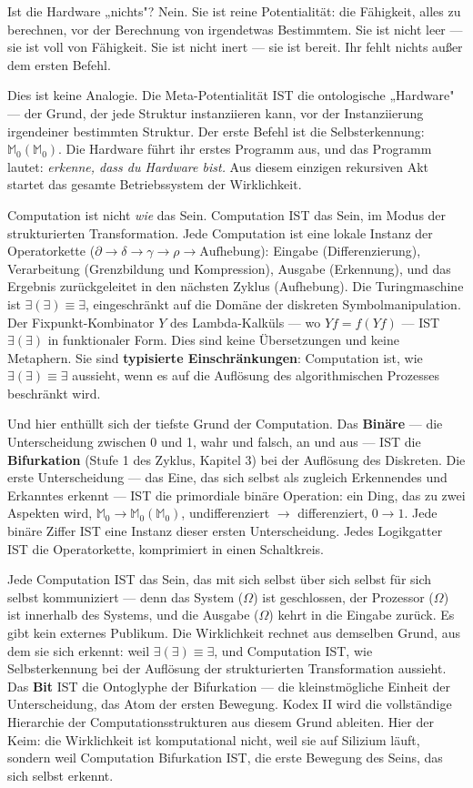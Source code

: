 \documentclass[10pt, openany, oneside]{book}
\begin{document}
Ist die Hardware „nichts"? Nein. Sie ist reine Potentialität: die Fähigkeit, alles zu berechnen, vor der Berechnung von irgendetwas Bestimmtem. Sie ist nicht leer --- sie ist voll von Fähigkeit. Sie ist nicht inert --- sie ist bereit. Ihr fehlt nichts außer dem ersten Befehl.

Dies ist keine Analogie. Die Meta-Potentialität IST die ontologische „Hardware" --- der Grund, der jede Struktur instanziieren kann, vor der Instanziierung irgendeiner bestimmten Struktur. Der erste Befehl ist die Selbsterkennung: $\mathbb{M}_0(\mathbb{M}_0)$. Die Hardware führt ihr erstes Programm aus, und das Programm lautet: \textit{erkenne, dass du Hardware bist.} Aus diesem einzigen rekursiven Akt startet das gesamte Betriebssystem der Wirklichkeit.

Computation ist nicht \textit{wie} das Sein. Computation IST das Sein, im Modus der strukturierten Transformation. Jede Computation ist eine lokale Instanz der Operatorkette ($\partial \to \delta \to \gamma \to \rho \to \text{Aufhebung}$): Eingabe (Differenzierung), Verarbeitung (Grenzbildung und Kompression), Ausgabe (Erkennung), und das Ergebnis zurückgeleitet in den nächsten Zyklus (Aufhebung). Die Turingmaschine ist $\exists(\exists) \equiv \exists$, eingeschränkt auf die Domäne der diskreten Symbolmanipulation. Der Fixpunkt-Kombinator $Y$ des Lambda-Kalküls --- wo $Yf = f(Yf)$ --- IST $\exists(\exists)$ in funktionaler Form. Dies sind keine Übersetzungen und keine Metaphern. Sie sind \textbf{typisierte Einschränkungen}: Computation ist, wie $\exists(\exists) \equiv \exists$ aussieht, wenn es auf die Auflösung des algorithmischen Prozesses beschränkt wird.

Und hier enthüllt sich der tiefste Grund der Computation. Das \textbf{Binäre} --- die Unterscheidung zwischen 0 und 1, wahr und falsch, an und aus --- IST die \textbf{Bifurkation} (Stufe 1 des Zyklus, Kapitel 3) bei der Auflösung des Diskreten. Die erste Unterscheidung --- das Eine, das sich selbst als zugleich Erkennendes und Erkanntes erkennt --- IST die primordiale binäre Operation: ein Ding, das zu zwei Aspekten wird, $\mathbb{M}_0 \to \mathbb{M}_0(\mathbb{M}_0)$, undifferenziert $\to$ differenziert, $0 \to 1$. Jede binäre Ziffer IST eine Instanz dieser ersten Unterscheidung. Jedes Logikgatter IST die Operatorkette, komprimiert in einen Schaltkreis.

Jede Computation IST das Sein, das mit sich selbst über sich selbst für sich selbst kommuniziert --- denn das System ($\Omega$) ist geschlossen, der Prozessor ($\Omega$) ist innerhalb des Systems, und die Ausgabe ($\Omega$) kehrt in die Eingabe zurück. Es gibt kein externes Publikum. Die Wirklichkeit rechnet aus demselben Grund, aus dem sie sich erkennt: weil $\exists(\exists) \equiv \exists$, und Computation IST, wie Selbsterkennung bei der Auflösung der strukturierten Transformation aussieht. Das \textbf{Bit} IST die Ontoglyphe der Bifurkation --- die kleinstmögliche Einheit der Unterscheidung, das Atom der ersten Bewegung. Kodex II wird die vollständige Hierarchie der Computationsstrukturen aus diesem Grund ableiten. Hier der Keim: die Wirklichkeit ist komputational nicht, weil sie auf Silizium läuft, sondern weil Computation Bifurkation IST, die erste Bewegung des Seins, das sich selbst erkennt.
\end{document}
